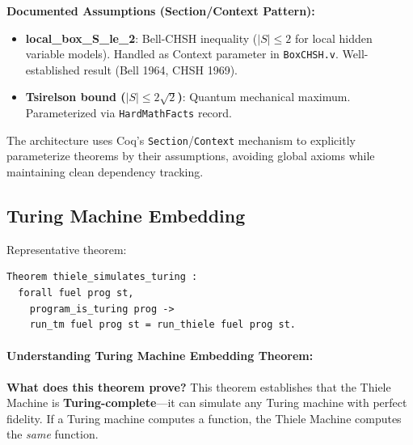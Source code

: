 \textbf{Documented Assumptions (Section/Context Pattern):}
\begin{itemize}
    \item \textbf{local\_box\_S\_le\_2}: Bell-CHSH inequality ($|S| \leq 2$ for local hidden variable models). Handled as Context parameter in \texttt{BoxCHSH.v}. Well-established result (Bell 1964, CHSH 1969).
    \item \textbf{Tsirelson bound ($|S| \leq 2\sqrt{2}$)}: Quantum mechanical maximum. Parameterized via \texttt{HardMathFacts} record.
\end{itemize}

The architecture uses Coq's \texttt{Section}/\texttt{Context} mechanism to explicitly parameterize theorems by their assumptions, avoiding global axioms while maintaining clean dependency tracking.

\subsection{Turing Machine Embedding}

Representative theorem:
\begin{lstlisting}
Theorem thiele_simulates_turing :
  forall fuel prog st,
    program_is_turing prog ->
    run_tm fuel prog st = run_thiele fuel prog st.
\end{lstlisting}

\paragraph{Understanding Turing Machine Embedding Theorem:}

\textbf{What does this theorem prove?} This theorem establishes that the Thiele Machine is \textbf{Turing-complete}---it can simulate any Turing machine with perfect fidelity. If a Turing machine computes a function, the Thiele Machine computes the \textit{same} function.

